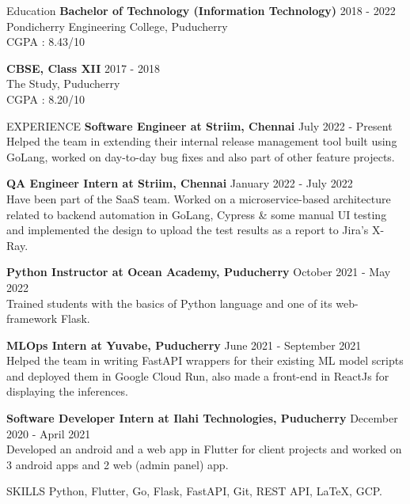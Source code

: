 \documentclass{template}
\begin{document}
\begin{rSection}{Education}
{\bf Bachelor of Technology (Information Technology)} \hfill {2018 - 2022}
\\ 
Pondicherry Engineering College, Puducherry \\
CGPA : 8.43/10

{\textbf{CBSE, Class XII}} \hfill 2017 - 2018\\
The Study, Puducherry \\
CGPA : 8.20/10

\end{rSection}

\begin{rSection}{EXPERIENCE}
\textbf{Software Engineer at Striim, Chennai} \hfill July 2022 - Present \\
Helped the team in extending their internal release management tool built using GoLang, worked on day-to-day bug fixes and also part of other feature projects.

\textbf{QA Engineer Intern at Striim, Chennai} \hfill January 2022 - July 2022 \\
Have been part of the SaaS team. Worked on a microservice-based architecture related to backend automation in GoLang, Cypress \& some manual UI testing and implemented the design to upload the test results as a report to Jira's X-Ray.

\textbf{Python Instructor at Ocean Academy, Puducherry} \hfill October 2021 - May 2022 \\
Trained students with the basics of Python language and one of its web-framework Flask.

\textbf{MLOps Intern at Yuvabe, Puducherry} \hfill June 2021 - September 2021 \\
Helped the team in writing FastAPI wrappers for their existing ML model scripts and deployed them in Google Cloud Run, also made a front-end in ReactJs for displaying the inferences.

\textbf{Software Developer Intern at Ilahi Technologies, Puducherry} \hfill December 2020 - April 2021 \\
Developed an android and a web app in Flutter for client projects and worked on 3 android apps and 2 web (admin panel) app.

\end{rSection} 

\begin{rSection}{SKILLS}
Python, Flutter, Go, Flask, FastAPI, Git, REST API, \LaTeX, GCP.

\end{rSection}
\end{document}
